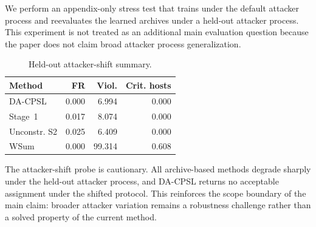 \documentclass[sigconf,review,anonymous]{acmart}
\begin{document}
We perform an appendix-only stress test that trains under the default
attacker process and reevaluates the learned archives under a held-out
attacker process. This experiment is not treated as an additional main
evaluation question because the paper does not claim broad attacker
process generalization.

\begin{table}[!htbp]
\centering
\caption{Held-out attacker-shift summary.}
\label{tab:app-attacker-shift-summary}
\begingroup
\small
\setlength{\tabcolsep}{4pt}
\renewcommand{\arraystretch}{1.10}
\begin{tabular*}{\columnwidth}{@{\extracolsep{\fill}}lrrr@{}}
\toprule
Method & FR & Viol. & Crit. hosts \\
\midrule
DA-CPSL & 0.000 & 6.994 & 0.000 \\
Stage~1 & 0.017 & 8.074 & 0.000 \\
Unconstr. S2 & 0.025 & 6.409 & 0.000 \\
WSum & 0.000 & 99.314 & 0.608 \\
\bottomrule
\end{tabular*}
\endgroup
\end{table}

The attacker-shift probe is cautionary. All archive-based methods
degrade sharply under the held-out attacker process, and DA-CPSL returns
no acceptable assignment under the shifted protocol. This reinforces the
scope boundary of the main claim: broader attacker variation remains a
robustness challenge rather than a solved property of the current method.
\end{document}
